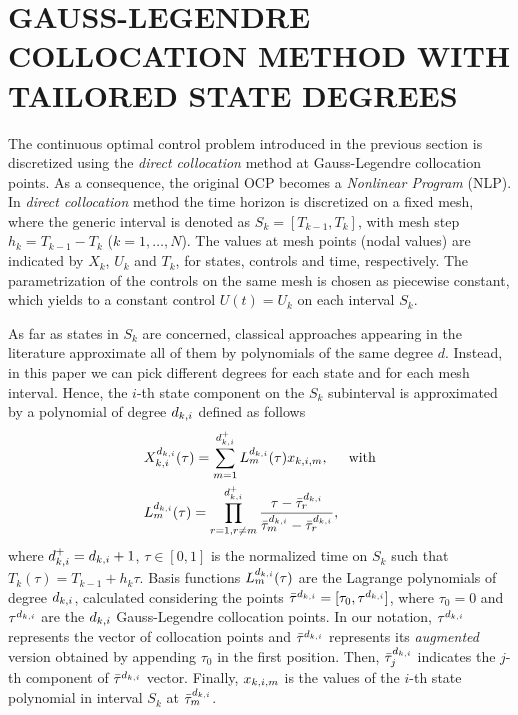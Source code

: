 \section*{GAUSS-LEGENDRE COLLOCATION METHOD WITH TAILORED STATE DEGREES}
The %
continuous optimal control problem introduced in the previous section is discretized using the \emph{direct collocation} method at Gauss-Legendre collocation points. As a consequence, the original OCP becomes a \emph{Nonlinear Program} (NLP). In \emph{direct collocation} method the time horizon is discretized on a fixed mesh, where the generic interval is denoted as $S_{k} = [T_{k-1}, T_{k}]$, with mesh step $h_{k} = T_{k-1} - T_{k}$ ($k = 1, \ldots, N $). The values at mesh points (nodal values) are indicated by $X_{k}$, $U_{k}$ and $T_{k}$, for  states, controls and time, respectively.
The parametrization of the controls on the same mesh is chosen as piecewise constant, which yields to a constant control $U(t) = U_{k}$ on each interval $S_k$.

As far as states in $S_{k}$ are concerned, classical approaches appearing in the literature approximate all of them by polynomials of the same degree $d$.
Instead, in this paper we can pick different degrees for each state and for each mesh interval. Hence, the $i$-th state component on the $S_{k}$ subinterval is approximated by a polynomial of degree $d_{k,i}$ defined as follows
\begin{subequations}
	\begin{align}
	&X_{k,i}^{d_{k,i}} (\tau) = \sum_{m=1}^{d_{k,i}^{+}} L_{m}^{d_{k,i}}(\tau)x_{k,i,m}, \hspace{5mm} \text{with} \label{Xpoly}\\
	&L_{m}^{d_{k,i}} (\tau) = \prod_{r=1, r\neq m}^{d_{k,i}^{+}} \dfrac{\tau - \bar{\tau}^{d_{k,i}}_{r}}{\bar{\tau}^{d_{k,i}}_{m} - \bar{\tau}^{d_{k,i}}_{r}}, \label{BLagrange}
	\end{align}
\end{subequations}
where $d_{k,i}^{+} = d_{k,i} + 1$, $\tau \in [0,1]$ is the normalized time on $S_k$ such that $T_k(\tau) = T_{k-1} + h_k\tau$.
Basis functions $L_{m}^{d_{k,i}} (\tau)$ are the Lagrange polynomials of degree $d_{k,i}$, calculated considering the points $\bar{\tau}^{d_{k,i}} = [\tau_{0}, \tau^{d_{k,i}}]$, where $\tau_{0} = 0$ and $\tau^{d_{k,i}}$ are the $d_{k,i}$ Gauss-Legendre collocation points. In our notation, $\tau^{d_{k,i}}$  represents the vector of collocation points and $\bar{\tau}^{d_{k,i}}$ represents its \emph{augmented} version obtained by appending $\tau_{0}$ in the first position.
Then, $\bar{\tau}^{d_{k,i}}_{j}$ indicates the $j$-th component of $\bar{\tau}^{d_{k,i}}$ vector.
Finally, $x_{k,i,m}$ is the values of the $i$-th state polynomial in interval $S_k$ at $\bar{\tau}^{d_{k,i}}_{m}$.

